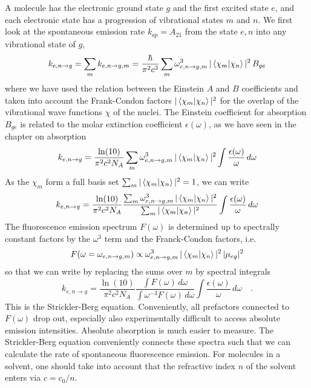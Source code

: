 A molecule has the electronic ground state $g$ and the first excited state $e$, and each electronic state has a progression of vibrational states $m$ and $n$. We first look at the spontaneous emission rate  $k_{\text{sp}} =  A_{21}$
from the state $e,n$ into any vibrational state of $g$, 
%
\begin{equation}
k_{e,n \rightarrow g}  = \sum_m  k_{e,n \rightarrow g,m}  = \frac{\hbar}{\pi^2 c^3} \sum_m  \omega_{e,n \rightarrow g,m}^3 \,  | \braket{\chi_m |  \chi_n} |^2 \, B_{ge} 
\end{equation}
where we have used the relation between the Einstein $A$ and $B$ coefficients and taken into account the Frank-Condon factors $ | \braket {\chi_m | \chi_n} |^2 $ for the overlap of the vibrational wave functions $\chi$ of the nuclei.
%
The Einstein coefficient for absorption $B_{ge} $ is related to the molar extinction coefficient $\epsilon(\omega)$, as we have seen in the chapter on absorption
\begin{equation}
 k_{e,n \rightarrow g}  = \frac{\ln(10)}{\pi^2 c^2 N_A} \sum_m  \omega_{e,n \rightarrow g,m}^3 \,  | \braket{\chi_m |  \chi_n} |^2
 \int \frac{\epsilon(\omega)}{\omega} \, d \omega
\end{equation}
%
As the  $\chi_m$ form a full basis set $\sum_m  | \braket {\chi_m | \chi_n} |^2 = 1$,  we can write
\begin{equation}
 k_{e,n \rightarrow g}  = \frac{\ln(10)}{\pi^2 c^2 N_A} 
%
\frac{ 
 \sum_m  \omega_{e,n \rightarrow g,m}^3 \,  | \braket{\chi_m |  \chi_n} |^2 }
 { \sum_m  | \braket {\chi_m | \chi_n} |^2 }
 \int \frac{\epsilon(\omega)}{\omega} \, d \omega
\end{equation}
The fluorescence emission spectrum $F(\omega)$ is determined up to spectrally constant factors by the $\omega^3$ term and the Franck-Condon factors, i.e.
\begin{equation}
 F(\omega =  \omega_{e,n \rightarrow g,m} )  \propto  \omega_{e,n \rightarrow g,m}^3 \,  | \braket{\chi_m |  \chi_n} |^2 \, | \mu_{eg} |^2
\end{equation}
so that we can write by replacing the sums over $m$ by  spectral integrals
\begin{equation}
 k_{e,n \rightarrow g}  =  \frac{\ln(10)}{\pi^2 c^2 N_A} \frac{\int F(\omega) \, d \omega}{\int \omega^{-3} F(\omega) \, d \omega }
 \int \frac{\epsilon(\omega)}{\omega} \, d \omega   \quad. 
\end{equation}
This is the Strickler-Berg equation. Conveniently, all prefactors connected to $F(\omega)$ drop out, especially also experimentally difficult to access absolute emission intensities. Absolute absorption is much  easier to measure. The Strickler-Berg equation conveniently connects these spectra such that we can calculate the rate of spontaneous fluorescence emission. For molecules in a solvent, one should take into account that the refractive index $n$ of the solvent enters via $c = c_0 / n$. 

